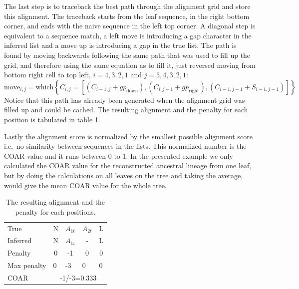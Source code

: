 The last step is to traceback the best path through the alignment grid and store this alignment.
The traceback starts from the leaf sequence, in the right bottom corner, and ends with the naive sequence in the left top corner.
A diagonal step is equivalent to a sequence match, a left move is introducing a gap character in the inferred list and a move up is introducing a gap in the true list.
The path is found by moving backwards following the same path that was used to fill up the grid, and therefore using the same equation as to fill it, just reversed moving from bottom right cell to top left, $i=4,3,2,1$ and $j=5,4,3,2,1$:
$$
\text{move}_{i,j} = \text{which}\left\{ C_{i,j} = [(C_{i-1,j} + gp_{\text{down}}), (C_{i,j-1} + gp_{\text{right}}), (C_{i-1,j-1 } + S_{i-1,j-1})] \right\}
$$
Notice that this path has already been generated when the alignment grid was filled up and could be cached.
The resulting alignment and the penalty for each position is tabulated in table \ref{NW_final_alignment}.

\clearpage
Lastly the alignment score is normalized by the smallest possible alignment score i.e.\ no similarity between sequences in the lists.
This normalized number is the COAR value and it runs between 0 to 1.
In the presented example we only calculated the COAR value for the reconstructed ancestral lineage from one leaf, but by doing the calculations on all leaves on the tree and taking the average, would give the mean COAR value for the whole tree.
\begin{table}[ht!]
\centering
\begin{tabular}{|lcccc|}
\hline
\multicolumn{1}{|l|}{True}     & \multicolumn{1}{c|}{N} & \multicolumn{1}{c|}{$A_{1t}$} & \multicolumn{1}{c|}{$A_{2t}$} & L                      \\
\multicolumn{1}{|l|}{Inferred} & \multicolumn{1}{c|}{N} & \multicolumn{1}{c|}{$A_{1i}$} & \multicolumn{1}{c|}{-}        & L                      \\ \hline
Penalty                        & 0                      & -1                             & 0                           & 0                      \\ \hline
Max penalty                    & \multicolumn{1}{l}{0}  & \multicolumn{1}{l}{-3}        & \multicolumn{1}{l}{0}       & \multicolumn{1}{l|}{0} \\ \hline
COAR                           & \multicolumn{4}{c|}{-1/-3=0.333}                                                                                    \\ \hline
\end{tabular}
    \caption{
         \label{NW_final_alignment}
             The resulting alignment and the penalty for each positions.
             }
\end{table}





